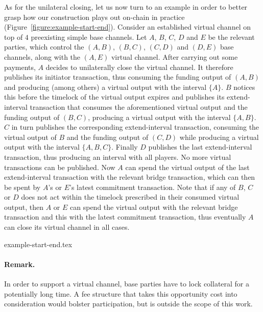   As for the unilateral closing, let us now turn to an example in order to
  better grasp how our construction plays out on-chain in practice
  (Figure~\ref{figure:example-start-end}). Consider an
  established virtual channel on top of $4$ preexisting simple base channels.
  Let $A$, $B$, $C$, $D$ and $E$ be the relevant parties, which control the $(A,
  B)$, $(B, C)$, $(C, D)$ and $(D, E)$ base channels, along with the $(A, E)$
  virtual channel. After carrying out some payments, $A$ decides to unilaterally
  close the virtual channel. It therefore publishes its initiator transaction,
  thus consuming the funding output of $(A, B)$ and producing (among others) a
  virtual output with the interval $\{A\}$. $B$ notices this before the timelock
  of the virtual output expires and publishes its extend-interval
  transaction that consumes the aforementioned virtual output and the funding
  output of $(B, C)$, producing a virtual output with the interval $\{A, B\}$.
  $C$ in turn publishes the corresponding extend-interval transaction, consuming
  the virtual output of $B$ and the funding output of $(C, D)$ while producing a
  virtual output with the interval $\{A, B, C\}$. Finally $D$ publishes the last
  extend-interval transaction, thus producing an interval with all players.
  No more virtual transactions can be published. Now $A$ can spend the virtual
  output of the last extend-interval transaction with the relevant bridge
  transaction, which can then be spent by $A$'s or $E$'s latest commitment
  transaction. Note that if any of $B$, $C$ or $D$ does not act within the
  timelock prescribed in their consumed virtual output, then $A$ or $E$ can
  spend the virtual output with the relevant bridge transaction and this with
  the latest commitment transaction, thus eventually $A$ can close its virtual
  channel in all cases.

  \begin{figure*}
    {example-start-end.tex}
    \caption{$4$ simple channels supporting a virtual. $A$ starts the closing
    procedure by publishing its initiator tx, then parties $B$--$D$ each
    publishes its extend-interval tx with the relevant interval. No party is
    negligent. Virtual outputs are marked with their interval.}
    \label{figure:example-start-end}
  \end{figure*}

  \paragraph{Remark.} In order to support a virtual channel, base parties have
  to lock collateral for a potentially long time. A fee structure that takes
  this opportunity cost into consideration would bolster participation, but is
  outside the scope of this work.
